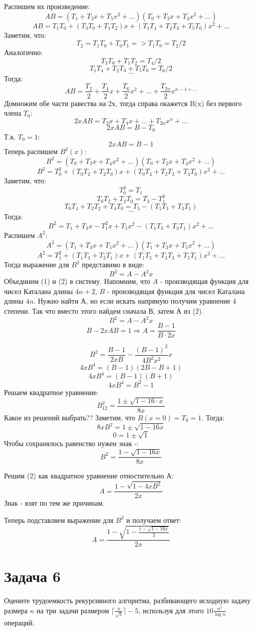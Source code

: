 \documentclass{article}
\begin{document}
Распишем их произведение: 
$$AB = (T_1+T_3x+T_5x^2+...)(T_0+T_2x+T_4x^2+...)$$
$$AB = T_1T_0+(T_3T_0+T_1T_2)x+(T_1T_4+T_2T_3+T_5T_0)x^2+...$$
Заметим, что:
$$T_2 = T_1T_0+T_0T_1 => T_1T_0 = T_2/2$$
Аналогично:
$$T_3T_0+T_1T_2 = T_4/2$$
$$T_1T_4+T_2T_3+T_5T_0 = T_6 / 2$$
$$...$$
Тогда:
$$AB = \frac{T_2}{2}+\frac{T_4}{2}x+\frac{T_6}{2}x^2+...+\frac{T_{2n}}{2}x^{n-1+...}$$
Домножим обе части равества на 2х, тогда справа окажется B(x) без первого члена $T_0$:
$$2xAB = T_2x+T_4x+...+T_{2n}x^n+...$$
$$2xAB = B-T_0$$
Т.к. $T_0 = 1$:
\begin{equation}
    2xAB = B-1
\end{equation}
Теперь распишем $B^2(x)$:
$$B^2 = (T_0+T_2x+T_4x^2+...)(T_0+T_2x+T_4x^2+...)$$
$$B^2 = T_0^2+(T_0T_2+T_2T_0)x+(T_0T_4+T_2T_2+T_4T_0)x^2+...$$
Заметим, что:
$$T_0^2 = T_1$$
$$T_0T_2+T_2T_0 = T_3-T_1^2$$
$$T_0T_4+T_2T_2+T_4T_0 = T_5-(T_1T_3+T_3T_1)$$
$$...$$
Тогда:
$$B^{2}=T_{1}+T_{3} x-T_{1}^{2} x+T_{5} x^{2}-(T_{1}T_{3}+T_{3}T_{1}) x^{2}+...$$
Распишем $A^2$:
$$A^2 = (T_1+T_3x+T_5x^2+...)(T_1+T_3x+T_5x^2+...)$$
$$A^2 = T_1^2+(T_1T_3+T_3T_1)x+(T_1T_5+T_3T_3+T_5T_1)x^2+...$$
Тогда выражение для $B^2$ представимо в виде:
\begin{equation}
    B^2 = A-A^2x
\end{equation}
Объединим (1) и (2) в систему. Напомним, что $A$ - производящая функция для чисел Каталана длины $4n+2$, $B$ - производящая функция для чисел Каталана длины $4n$. Нужно найти А, но если искать напрямую получим уравнение 4 степени. Так что вместо этого найдем сначала В, затем А из (2).
$$B^{2}=A-A^{2}x$$
$$B-2xAB=1  \Rightarrow A=\frac{B-1}{B \cdot 2 x}$$

$$B^{2}=\frac{B-1}{2 x B}-\frac{(B-1)^{2}}{4 B^{2} x^{2}} x$$
$$ 4xB^{4}=(B-1)(2 B-B+1)$$
$$ 4xB^{4}=(B-1)(B+1)$$
$$ 4xB^{4}=B^{2}-1$$
Решаем квадратное уравнение:
$$B_{12}^{2}=\frac{1 \pm \sqrt{1-16 \cdot x}}{8 x}$$
Какое из решений выбрать?? Заметим, что $B(x=0)=T_0=1$. Тогда:
    $$8xB^{2}=1 \pm \sqrt{1-16 x}$$
    $$0=1 \pm \sqrt{1}$$
Чтобы сохранялось равенство нужен знак -:
    $$B^{2}=\frac{1-\sqrt{1-16 x}}{8 x}$$
    
Решим (2) как квадратное уравнение отностительно А:
$$A=\frac{1-\sqrt{1-4 x B^{2}}}{2 x}$$
Знак - взят по тем же причинам.

Теперь подставляем выражение для $B^2$ и получаем ответ:
$$A=\frac{1-\sqrt{1-\frac{1-\sqrt{1-16 x}}{2}}}{2 x}$$

\section*{Задача 6}
Оцените трудоемкость рекурсивного алгоритма, разбивающего исходную задачу размера $n$ на три задачи размером $\lceil\frac{n}{\sqrt{3}}\rceil-5$, используя для этого $10\frac{n^3}{\log n}$ операций.
\end{document}
